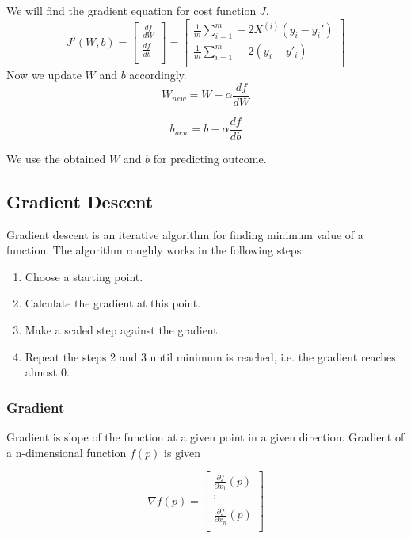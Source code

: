 We will find the gradient equation for cost function $J$.
\begin{equation}
    J'(W,b) = \begin{bmatrix}
        \frac{df}{dW} \\
        \frac{df}{db} \\
    \end{bmatrix}
    =
    \begin{bmatrix}
        \frac{1}{m} \sum_{i=1}^{m} -2X^{(i)}(y_i-y_i') \\
        \frac{1}{m} \sum_{i=1}^{m} -2(y_i-y'_i) \\
    \end{bmatrix}
\end{equation}
Now we update $W$ and $b$ accordingly.
\begin{equation}
    W_{new} = W - \alpha \frac{df}{dW}
\end{equation}

\begin{equation}
    b_{new} = b - \alpha \frac{df}{db}
\end{equation}

We use the obtained $W$ and $b$ for predicting outcome.

\subsection{Gradient Descent}
Gradient descent is an iterative algorithm for finding minimum value of a function.
The algorithm roughly works in the following steps:
\begin{enumerate}
    \item Choose a starting point.
    \item Calculate the gradient at this point.
    \item Make a scaled step against the gradient.
    \item Repeat the steps 2 and 3 until minimum is reached, i.e. the gradient reaches almost 0.
\end{enumerate}

\subsubsection{Gradient}
Gradient is slope of the function at a given point in a given direction. Gradient of a n-dimensional 
function $f(p)$ is given 

\begin{equation}
    \nabla f(p) = \begin{bmatrix}
        \frac{\partial f}{\partial x_{1}}(p) \\
        \vdots \\
        \frac{\partial f}{\partial x_{n}}(p) \\
    \end{bmatrix}
\end{equation}

